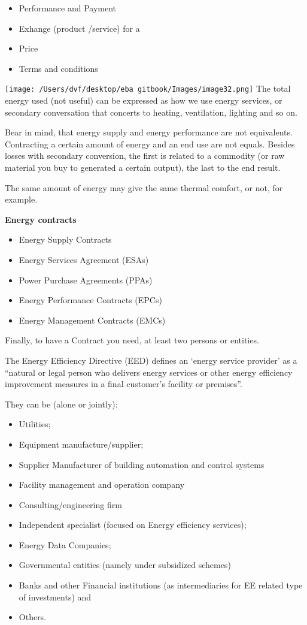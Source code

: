 \documentclass[]{book}
\theoremstyle{definition}
\theoremstyle{definition}
\theoremstyle{definition}
\theoremstyle{remark}
\begin{document}
\begin{itemize}
\item
  Performance and Payment
\item
  Exhange (product /service) for a
\item
  Price
\item
  Terms and conditions
\end{itemize}

\texttt{[image: /Users/dvf/desktop/eba gitbook/Images/image32.png]}
The total energy used (not useful) can be expressed as how we use energy
services, or secondary conversation that concerts to heating,
ventilation, lighting and so on.

Bear in mind, that energy supply and energy performance are not
equivalents. Contracting a certain amount of energy and an end use are
not equals. Besides losses with secondary conversion, the first is
related to a commodity (or raw material you buy to generated a certain
output), the last to the end result.

The same amount of energy may give the same thermal comfort, or not, for
example.

\textbf{Energy contracts}

\begin{itemize}
\item
  Energy Supply Contracts
\item
  Energy Services Agreement (ESAs)
\item
  Power Purchase Agreements (PPAs)
\item
  Energy Performance Contracts (EPCs)
\item
  Energy Management Contracts (EMCs)
\end{itemize}

Finally, to have a Contract you need, at least two persons or entities.

The Energy Efficiency Directive (EED) defines an `energy service
provider' as a ``natural or legal person who delivers energy services or
other energy efficiency improvement measures in a final customer's
facility or premises''.

They can be (alone or jointly):

\begin{itemize}
\item
  Utilities;
\item
  Equipment manufacture/supplier;
\item
  Supplier Manufacturer of building automation and control systems
\item
  Facility management and operation company
\item
  Consulting/engineering firm
\item
  Independent specialist (focused on Energy efficiency services);
\item
  Energy Data Companies;
\item
  Governmental entities (namely under subsidized schemes)
\item
  Banks and other Financial institutions (as intermediaries for EE
  related type of investments) and
\item
  Others.
\end{itemize}
\end{document}
